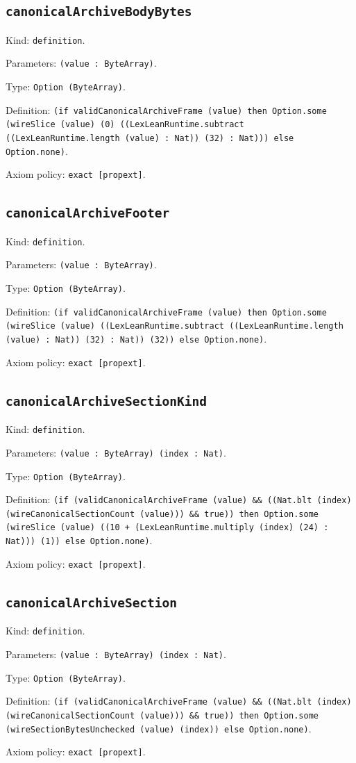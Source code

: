 \documentclass[11pt]{article}
\begin{document}
\subsection*{\texttt{canonicalArchiveBodyBytes}}
\noindent Kind: \texttt{definition}.\par
\noindent Parameters: \texttt{(value : ByteArray)}.\par
\noindent Type: \texttt{Option (ByteArray)}.\par
\noindent Definition: \texttt{(if validCanonicalArchiveFrame (value) then Option.some (wireSlice (value) (0) ((LexLeanRuntime.subtract ((LexLeanRuntime.length (value) : Nat)) (32) : Nat))) else Option.none)}.\par
\noindent Axiom policy: \texttt{exact [propext]}.\par
\subsection*{\texttt{canonicalArchiveFooter}}
\noindent Kind: \texttt{definition}.\par
\noindent Parameters: \texttt{(value : ByteArray)}.\par
\noindent Type: \texttt{Option (ByteArray)}.\par
\noindent Definition: \texttt{(if validCanonicalArchiveFrame (value) then Option.some (wireSlice (value) ((LexLeanRuntime.subtract ((LexLeanRuntime.length (value) : Nat)) (32) : Nat)) (32)) else Option.none)}.\par
\noindent Axiom policy: \texttt{exact [propext]}.\par
\subsection*{\texttt{canonicalArchiveSectionKind}}
\noindent Kind: \texttt{definition}.\par
\noindent Parameters: \texttt{(value : ByteArray) (index : Nat)}.\par
\noindent Type: \texttt{Option (ByteArray)}.\par
\noindent Definition: \texttt{(if (validCanonicalArchiveFrame (value) \&\& ((Nat.blt (index) (wireCanonicalSectionCount (value))) \&\& true)) then Option.some (wireSlice (value) ((10 + (LexLeanRuntime.multiply (index) (24) : Nat))) (1)) else Option.none)}.\par
\noindent Axiom policy: \texttt{exact [propext]}.\par
\subsection*{\texttt{canonicalArchiveSection}}
\noindent Kind: \texttt{definition}.\par
\noindent Parameters: \texttt{(value : ByteArray) (index : Nat)}.\par
\noindent Type: \texttt{Option (ByteArray)}.\par
\noindent Definition: \texttt{(if (validCanonicalArchiveFrame (value) \&\& ((Nat.blt (index) (wireCanonicalSectionCount (value))) \&\& true)) then Option.some (wireSectionBytesUnchecked (value) (index)) else Option.none)}.\par
\noindent Axiom policy: \texttt{exact [propext]}.\par
\end{document}
